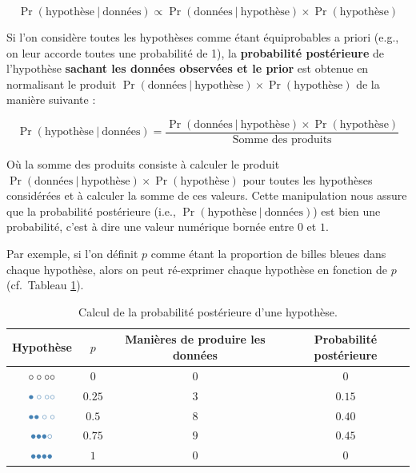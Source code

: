 \documentclass[
  a4paper,11pt,twoside,onecolumn,openright,final,oldfontcommands]{memoir}
\theoremstyle{definition}
\theoremstyle{definition}
\theoremstyle{definition}
\theoremstyle{remark}
\begin{document}
\[
\Pr(\text{hypothèse} \ | \ \text{données}) \propto \Pr(\text{données} \ | \ \text{hypothèse}) \times \Pr(\text{hypothèse})
\]

Si l'on considère toutes les hypothèses comme étant équiprobables a priori (e.g., on leur accorde toutes une probabilité de 1), la \textbf{probabilité postérieure} de l'hypothèse \textbf{sachant les données observées et le prior} est obtenue en normalisant le produit \(\Pr(\text{données} \ | \ \text{hypothèse}) \times \Pr(\text{hypothèse})\) de la manière suivante :

\[
\Pr(\text{hypothèse} \ | \ \text{données}) = \frac{\Pr(\text{données} \ | \ \text{hypothèse}) \times \Pr(\text{hypothèse})}{\text{Somme des produits}}
\]

Où la somme des produits consiste à calculer le produit \(\Pr(\text{données} \ | \ \text{hypothèse}) \times \Pr(\text{hypothèse})\) pour toutes les hypothèses considérées et à calculer la somme de ces valeurs. Cette manipulation nous assure que la probabilité postérieure (i.e., \(\Pr(\text{hypothèse} \ | \ \text{données})\)) est bien une probabilité, c'est à dire une valeur numérique bornée entre \(0\) et \(1\).

Par exemple, si l'on définit \(p\) comme étant la proportion de billes bleues dans chaque hypothèse, alors on peut ré-exprimer chaque hypothèse en fonction de \(p\) (cf.~Tableau \ref{tab:enumeration-table}).

\begin{table}[!htb]

\begin{center}
\begin{threeparttable}

\caption{\label{tab:enumeration-table}Calcul de la probabilité postérieure d'une hypothèse.}

\begin{tabular}{cccc}
\toprule
Hypothèse & $p$ & Manières de produire les données & Probabilité postérieure\\
\midrule
$\LARGE \circ \circ \circ \circ$ & $0$ & $0$ & $0$\\
$\LARGE \color{steelblue}{\bullet} \circ \circ \circ$ & $0.25$ & $3$ & $0.15$\\
$\LARGE \color{steelblue}{\bullet} \color{steelblue}{\bullet} \circ \circ$ & $0.5$ & $8$ & $0.40$\\
$\LARGE \color{steelblue}{\bullet} \color{steelblue}{\bullet} \color{steelblue}{\bullet} \circ$ & $0.75$ & $9$ & $0.45$\\
$\LARGE \color{steelblue}{\bullet} \color{steelblue}{\bullet} \color{steelblue}{\bullet} \color{steelblue}{\bullet}$ & $1$ & $0$ & $0$\\
\bottomrule
\end{tabular}

\end{threeparttable}
\end{center}

\end{table}
\end{document}
